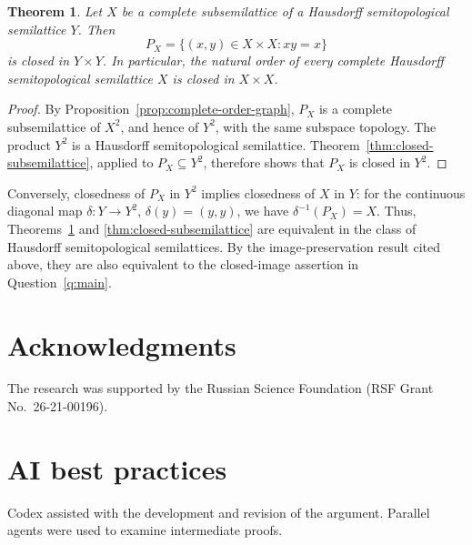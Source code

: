 \documentclass[11pt,a4paper]{article}
\newtheorem{theorem}{Theorem}[section]
\theoremstyle{definition}
\theoremstyle{remark}
\numberwithin{equation}{section}
\begin{document}
\begin{theorem}\label{thm:closed-natural-order}
Let \(X\) be a complete subsemilattice of a Hausdorff semitopological
semilattice \(Y\). Then
\[
P_X=\{(x,y)\in X\times X:xy=x\}
\]
is closed in \(Y\times Y\). In particular, the natural order of every
complete Hausdorff semitopological semilattice \(X\) is closed in
\(X\times X\).
\end{theorem}

\begin{proof}
By Proposition~\ref{prop:complete-order-graph}, \(P_X\) is a complete
subsemilattice of \(X^2\), and hence of \(Y^2\), with the same subspace
topology. The product \(Y^2\) is a Hausdorff semitopological semilattice.
Theorem~\ref{thm:closed-subsemilattice}, applied to \(P_X\subseteq Y^2\),
therefore shows that \(P_X\) is closed in \(Y^2\).
\end{proof}

Conversely, closedness of \(P_X\) in \(Y^2\) implies closedness of
\(X\) in \(Y\): for the continuous diagonal map
\(\delta:Y\to Y^2\), \(\delta(y)=(y,y)\), we have
\(\delta^{-1}(P_X)=X\). Thus, Theorems~\ref{thm:closed-natural-order} and
\ref{thm:closed-subsemilattice} are equivalent in the class of Hausdorff
semitopological semilattices. By the
image-preservation result cited above, they are also equivalent to the
closed-image assertion in Question~\ref{q:main}.


\section*{Acknowledgments}
The research was supported by the Russian Science Foundation (RSF Grant No.~26-21-00196).




\section*{AI best practices}
Codex assisted with the development and revision of the argument.
Parallel agents were used to examine intermediate proofs.
\end{document}
